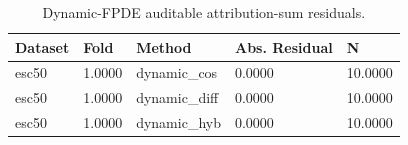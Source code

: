 \begin{table}[htbp]
\centering
\caption{Dynamic-FPDE auditable attribution-sum residuals.}
\label{tab:dynamic-fpde-additivity}
\begin{tabular}{lllll}
\toprule
Dataset & Fold & Method & Abs. Residual & N \\
\midrule
esc50 & 1.0000 & dynamic\_cos & 0.0000 & 10.0000 \\
esc50 & 1.0000 & dynamic\_diff & 0.0000 & 10.0000 \\
esc50 & 1.0000 & dynamic\_hyb & 0.0000 & 10.0000 \\
\bottomrule
\end{tabular}
\end{table}
